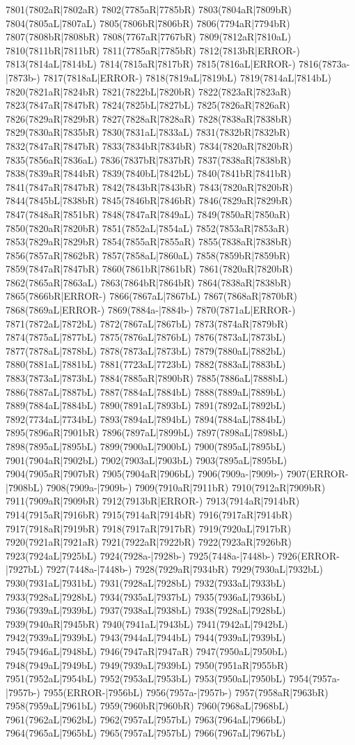 7801(7802aR|7802aR) 7802(7785aR|7785bR) 7803(7804aR|7809bR) 7804(7805aL|7807aL) 7805(7806bR|7806bR) 7806(7794aR|7794bR) 7807(7808bR|7808bR) 7808(7767aR|7767bR) 7809(7812aR|7810aL) 7810(7811bR|7811bR) 7811(7785aR|7785bR) 7812(7813bR|ERROR-) 7813(7814aL|7814bL) 7814(7815aR|7817bR) 7815(7816aL|ERROR-) 7816(7873a-|7873b-) 7817(7818aL|ERROR-) 7818(7819aL|7819bL) 7819(7814aL|7814bL) 7820(7821aR|7824bR) 7821(7822bL|7820bR) 7822(7823aR|7823aR) 7823(7847aR|7847bR) 7824(7825bL|7827bL) 7825(7826aR|7826aR) 7826(7829aR|7829bR) 7827(7828aR|7828aR) 7828(7838aR|7838bR) 7829(7830aR|7835bR) 7830(7831aL|7833aL) 7831(7832bR|7832bR) 7832(7847aR|7847bR) 7833(7834bR|7834bR) 7834(7820aR|7820bR) 7835(7856aR|7836aL) 7836(7837bR|7837bR) 7837(7838aR|7838bR) 7838(7839aR|7844bR) 7839(7840bL|7842bL) 7840(7841bR|7841bR) 7841(7847aR|7847bR) 7842(7843bR|7843bR) 7843(7820aR|7820bR) 7844(7845bL|7838bR) 7845(7846bR|7846bR) 7846(7829aR|7829bR) 7847(7848aR|7851bR) 7848(7847aR|7849aL) 7849(7850aR|7850aR) 7850(7820aR|7820bR) 7851(7852aL|7854aL) 7852(7853aR|7853aR) 7853(7829aR|7829bR) 7854(7855aR|7855aR) 7855(7838aR|7838bR) 7856(7857aR|7862bR) 7857(7858aL|7860aL) 7858(7859bR|7859bR) 7859(7847aR|7847bR) 7860(7861bR|7861bR) 7861(7820aR|7820bR) 7862(7865aR|7863aL) 7863(7864bR|7864bR) 7864(7838aR|7838bR) 7865(7866bR|ERROR-) 7866(7867aL|7867bL) 7867(7868aR|7870bR) 7868(7869aL|ERROR-) 7869(7884a-|7884b-) 7870(7871aL|ERROR-) 7871(7872aL|7872bL) 7872(7867aL|7867bL) 7873(7874aR|7879bR) 7874(7875aL|7877bL) 7875(7876aL|7876bL) 7876(7873aL|7873bL) 7877(7878aL|7878bL) 7878(7873aL|7873bL) 7879(7880aL|7882bL) 7880(7881aL|7881bL) 7881(7723aL|7723bL) 7882(7883aL|7883bL) 7883(7873aL|7873bL) 7884(7885aR|7890bR) 7885(7886aL|7888bL) 7886(7887aL|7887bL) 7887(7884aL|7884bL) 7888(7889aL|7889bL) 7889(7884aL|7884bL) 7890(7891aL|7893bL) 7891(7892aL|7892bL) 7892(7734aL|7734bL) 7893(7894aL|7894bL) 7894(7884aL|7884bL) 7895(7896aR|7901bR) 7896(7897aL|7899bL) 7897(7898aL|7898bL) 7898(7895aL|7895bL) 7899(7900aL|7900bL) 7900(7895aL|7895bL) 7901(7904aR|7902bL) 7902(7903aL|7903bL) 7903(7895aL|7895bL) 7904(7905aR|7907bR) 7905(7904aR|7906bL) 7906(7909a-|7909b-) 7907(ERROR-|7908bL) 7908(7909a-|7909b-) 7909(7910aR|7911bR) 7910(7912aR|7909bR) 7911(7909aR|7909bR) 7912(7913bR|ERROR-) 7913(7914aR|7914bR) 7914(7915aR|7916bR) 7915(7914aR|7914bR) 7916(7917aR|7914bR) 7917(7918aR|7919bR) 7918(7917aR|7917bR) 7919(7920aL|7917bR) 7920(7921aR|7921aR) 7921(7922aR|7922bR) 7922(7923aR|7926bR) 7923(7924aL|7925bL) 7924(7928a-|7928b-) 7925(7448a-|7448b-) 7926(ERROR-|7927bL) 7927(7448a-|7448b-) 7928(7929aR|7934bR) 7929(7930aL|7932bL) 7930(7931aL|7931bL) 7931(7928aL|7928bL) 7932(7933aL|7933bL) 7933(7928aL|7928bL) 7934(7935aL|7937bL) 7935(7936aL|7936bL) 7936(7939aL|7939bL) 7937(7938aL|7938bL) 7938(7928aL|7928bL) 7939(7940aR|7945bR) 7940(7941aL|7943bL) 7941(7942aL|7942bL) 7942(7939aL|7939bL) 7943(7944aL|7944bL) 7944(7939aL|7939bL) 7945(7946aL|7948bL) 7946(7947aR|7947aR) 7947(7950aL|7950bL) 7948(7949aL|7949bL) 7949(7939aL|7939bL) 7950(7951aR|7955bR) 7951(7952aL|7954bL) 7952(7953aL|7953bL) 7953(7950aL|7950bL) 7954(7957a-|7957b-) 7955(ERROR-|7956bL) 7956(7957a-|7957b-) 7957(7958aR|7963bR) 7958(7959aL|7961bL) 7959(7960bR|7960bR) 7960(7968aL|7968bL) 7961(7962aL|7962bL) 7962(7957aL|7957bL) 7963(7964aL|7966bL) 7964(7965aL|7965bL) 7965(7957aL|7957bL) 7966(7967aL|7967bL) 